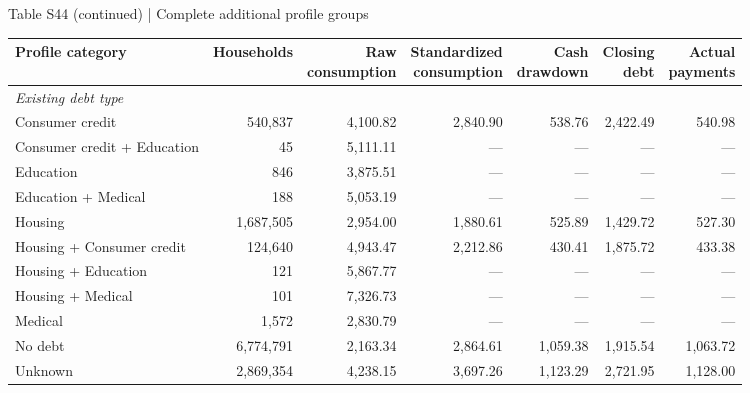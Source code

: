 \documentclass[10pt]{article}
\begin{document}
\begin{center}\begin{minipage}{\textwidth}\fontsize{7.7}{9.3}\selectfont
Table S44 (continued) | Complete additional profile groups
\par\vspace{4pt}
\begin{tabularx}{\textwidth}{@{}Xrrrrrr@{}}\toprule
Profile category & Households & \shortstack[r]{Raw\\consumption} & \shortstack[r]{Standardized\\consumption} & \shortstack[r]{Cash\\drawdown} & \shortstack[r]{Closing\\debt} & \shortstack[r]{Actual\\payments} \\
\midrule
\multicolumn{7}{l}{\textit{Existing debt type}} \\

Consumer credit & 540,837 & 4,100.82 & 2,840.90 & 538.76 & 2,422.49 & 540.98 \\

Consumer credit + Education & 45 & 5,111.11 & --- & --- & --- & --- \\

Education & 846 & 3,875.51 & --- & --- & --- & --- \\

Education + Medical & 188 & 5,053.19 & --- & --- & --- & --- \\

Housing & 1,687,505 & 2,954.00 & 1,880.61 & 525.89 & 1,429.72 & 527.30 \\

Housing + Consumer credit & 124,640 & 4,943.47 & 2,212.86 & 430.41 & 1,875.72 & 433.38 \\

Housing + Education & 121 & 5,867.77 & --- & --- & --- & --- \\

Housing + Medical & 101 & 7,326.73 & --- & --- & --- & --- \\

Medical & 1,572 & 2,830.79 & --- & --- & --- & --- \\

No debt & 6,774,791 & 2,163.34 & 2,864.61 & 1,059.38 & 1,915.54 & 1,063.72 \\

Unknown & 2,869,354 & 4,238.15 & 3,697.26 & 1,123.29 & 2,721.95 & 1,128.00 \\


\end{tabularx}
\end{minipage}
\end{center}
\end{document}
